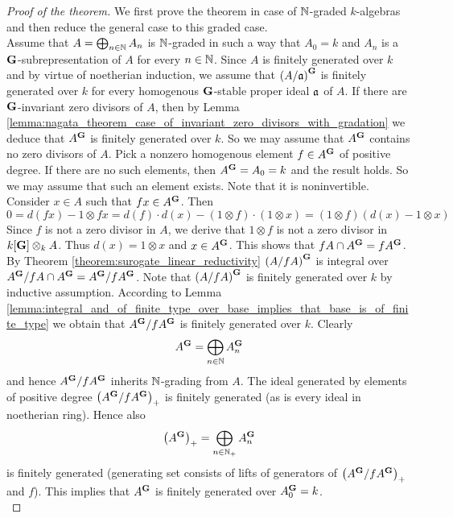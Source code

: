 \begin{proof}[Proof of the theorem]
We first prove the theorem in case of ${\mathbb N}$-graded $k$-algebras and then reduce the general case to this graded case.\\
Assume that $A = \bigoplus_{n\in {\mathbb N}}A_n$ is ${\mathbb N}$-graded in such a way that $A_0 = k$ and $A_n$ is a $\mathbf{G}$-subrepresentation of $A$ for every $n\in {\mathbb N}$. Since $A$ is finitely generated over $k$ and by virtue of noetherian induction, we assume that $\left(A/\mathfrak{a}\right)^{\mathbf{G}}$ is finitely generated over $k$ for every homogenous $\mathbf{G}$-stable proper ideal $\mathfrak{a}$ of $A$. If there are $\mathbf{G}$-invariant zero divisors of $A$, then by Lemma \ref{lemma:nagata_theorem_case_of_invariant_zero_divisors_with_gradation} we deduce that $A^{\mathbf{G}}$ is finitely generated over $k$. So we may assume that $A^{\mathbf{G}}$ contains no zero divisors of $A$. Pick a nonzero homogenous element $f\in A^{\mathbf{G}}$ of positive degree. If there are no such elements, then $A^{\mathbf{G}} = A_0 = k$ and the result holds. So we may assume that such an element exists. Note that it is noninvertible. Consider $x\in A$ such that $fx\in A^{\mathbf{G}}$. Then 
$$0 = d(fx) - 1\otimes fx = d(f)\cdot d(x) - (1\otimes f)\cdot (1\otimes x) = (1\otimes f)\left(d(x) - 1\otimes x\right)$$
Since $f$ is not a zero divisor in $A$, we derive that $1\otimes f$ is not a zero divisor in $k[\mathbf{G}]\otimes_kA$. Thus $d(x) = 1\otimes x$ and $x\in A^{\mathbf{G}}$. This shows that $fA\cap A^{\mathbf{G}} = fA^{\mathbf{G}}$. By Theorem \ref{theorem:surogate_linear_reductivity} $\left(A/fA\right)^{\mathbf{G}}$ is integral over $A^{\mathbf{G}}/fA\cap A^{\mathbf{G}} = A^{\mathbf{G}}/fA^{\mathbf{G}}$. Note that $\left(A/fA\right)^{\mathbf{G}}$ is finitely generated over $k$ by inductive assumption. According to Lemma \ref{lemma:integral_and_of_finite_type_over_base_implies_that_base_is_of_finite_type} we obtain that $A^{\mathbf{G}}/fA^{\mathbf{G}}$ is finitely generated over $k$. Clearly
$$A^{\mathbf{G}} = \bigoplus_{n\in {\mathbb N}}A_n^{\mathbf{G}}$$
and hence $A^{\mathbf{G}}/fA^{\mathbf{G}}$ inherits ${\mathbb N}$-grading from $A$. The ideal generated by elements of positive degree $\left(A^{\mathbf{G}}/fA^{\mathbf{G}}\right)_+$ is finitely generated (as is every ideal in noetherian ring). Hence also
$$\left(A^{\mathbf{G}}\right)_+ = \bigoplus_{n\in {\mathbb N}_+}A_n^{\mathbf{G}}$$
is finitely generated (generating set consists of lifts of generators of $\left(A^{\mathbf{G}}/fA^{\mathbf{G}}\right)_+$ and $f$). This implies that $A^{\mathbf{G}}$ is finitely generated over $A_0^{\mathbf{G}} = k$.\\

\end{proof}
